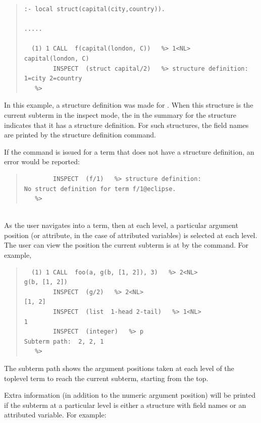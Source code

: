\begin{descr}{1cm}
\begin{quote}
\begin{verbatim}
:- local struct(capital(city,country)).

.....

  (1) 1 CALL  f(capital(london, C))   %> 1<NL>
capital(london, C)
        INSPECT  (struct capital/2)   %> structure definition:
1=city 2=country
   %>
\end{verbatim}
\end{quote}

In this example, a structure definition was made for . When
this structure is the current subterm in the inspect mode, the
 in the summary for the structure indicates that it has
a structure definition. For such structures, the field names are printed by
the structure definition command.

If the command is issued for a term that does not have a structure
definition, an error would be reported:

\begin{quote}
\begin{verbatim}
        INSPECT  (f/1)   %> structure definition:
No struct definition for term f/1@eclipse.
   %>
\end{verbatim}
\end{quote}

\\
As the user navigates into a term, then at each level, a particular
argument position (or attribute, in the case of attributed variables) is
selected at each level. The user can view the position the current subterm
is at by the  command. For example,

\begin{quote}
\begin{verbatim}
  (1) 1 CALL  foo(a, g(b, [1, 2]), 3)   %> 2<NL>
g(b, [1, 2])
        INSPECT  (g/2)   %> 2<NL>
[1, 2]
        INSPECT  (list  1-head 2-tail)   %> 1<NL>
1
        INSPECT  (integer)   %> p
Subterm path:  2, 2, 1
   %>
\end{verbatim}
\end{quote}

The subterm path shows the argument positions taken at each level of the
toplevel term to reach the current subterm, starting from the top.

Extra information (in addition to the numeric argument position) will be
printed if the subterm at a particular level is either a structure with
field names or an attributed variable. For example:


\end{descr}
